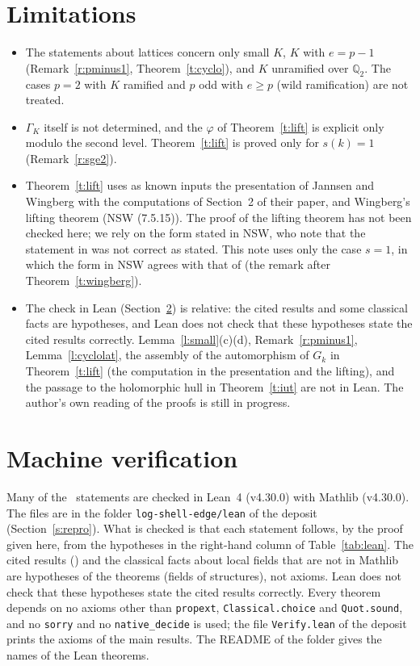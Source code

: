 \documentclass[11pt,a4paper]{article}
\newcommand{\lab}[2]{{\upshape\fcolorbox{#1}{#1!8}{\scriptsize\sffamily\bfseries\textcolor{#1}{#2}}}}
\newcommand{\tagS}{\lab{blue}{S}}
\newcommand{\tagP}{\lab{ForestGreen}{P}}
\theoremstyle{plain}
\theoremstyle{definition}
\theoremstyle{remark}
\begin{document}
\section{Limitations}
\begin{itemize}
\item The statements about lattices concern only small $K$, $K$ with $e=p-1$ (Remark~\ref{r:pminus1},
Theorem~\ref{t:cyclo}), and $K$ unramified over $\mathbb Q_2$. The cases $p=2$ with $K$ ramified and $p$ odd with
$e\ge p$ (wild ramification) are not treated.
\item $\Gamma_K$ itself is not determined, and the $\varphi$ of Theorem~\ref{t:lift} is explicit only modulo the second
level. Theorem~\ref{t:lift} is proved only for $s(k)=1$ (Remark~\ref{r:sge2}).
\item Theorem~\ref{t:lift} uses as known inputs the presentation of Jannsen and Wingberg with the computations of
Section~2 of their paper, and Wingberg's lifting theorem (NSW (7.5.15)). The proof of the lifting theorem \cite{Wi}
has not been checked here; we rely on the form stated in NSW, who note that the statement in \cite{Wi} was not correct
as stated. This note uses only the case $s=1$, in which the form in NSW agrees with that of \cite[Prop.~2.6]{Nishio26}
(the remark after Theorem~\ref{t:wingberg}).
\item The check in Lean (Section~\ref{s:lean}) is relative: the cited results and some classical facts are hypotheses,
and Lean does not check that these hypotheses state the cited results correctly. Lemma~\ref{l:small}(c)(d),
Remark~\ref{r:pminus1}, Lemma~\ref{l:cyclolat}, the assembly of the automorphism of $G_k$ in Theorem~\ref{t:lift}
(the computation in the presentation and the lifting), and the passage to the holomorphic hull in
Theorem~\ref{t:iut} are not in Lean. The author's own reading of the proofs is still in progress.
\end{itemize}

\section{Machine verification}\label{s:lean}

Many of the \tagP\ statements are checked in Lean~4 (v4.30.0) with Mathlib (v4.30.0). The files are in the folder
\texttt{log-shell-edge/lean} of the deposit (Section~\ref{s:repro}). What is checked is that each statement follows, by
the proof given here, from the hypotheses in the right-hand column of Table~\ref{tab:lean}. The cited results (\tagS)
and the classical facts about local fields that are not in Mathlib are hypotheses of the theorems (fields of
structures), not axioms. Lean does not check that these hypotheses state the cited results correctly. Every theorem
depends on no axioms other than \texttt{propext}, \texttt{Classical.choice} and \texttt{Quot.sound}, and no
\texttt{sorry} and no \texttt{native\_decide} is used; the file \texttt{Verify.lean} of the deposit prints the axioms
of the main results. The README of the folder gives the names of the Lean theorems.
\end{document}
